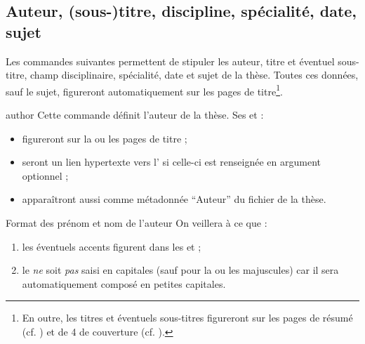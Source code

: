 \subsection{Auteur, (sous-)titre, discipline, spécialité,
  date, sujet}\label{sec-caracteristiques}

Les commandes suivantes permettent de stipuler les auteur, titre et éventuel
sous-titre, champ disciplinaire, spécialité, date et sujet de la thèse. Toutes
ces données, sauf le sujet, figureront automatiquement sur les pages de
titre\footnote{En outre, les titres et éventuels sous-titres figureront sur les
  pages de résumé (cf. ) et de 4\ieme{} de couverture (cf.
  ).}.
%
\begin{docCommand}[doc description=\mandatory]{author}{}%
  Cette commande définit l'auteur de la thèse. Ses  et
   :
  \begin{itemize}
  \item figureront sur la ou les pages de titre ;
  \item%
    seront un lien hypertexte vers l' si celle-ci est
    renseignée en argument optionnel ;
  \item apparaîtront aussi comme métadonnée \enquote{Auteur} du
    fichier \pdf{} de la thèse.
  \end{itemize}
  \begin{dbwarning}{Format des prénom et nom de l'auteur}{}
    On veillera à ce que :
    \begin{enumerate}
    \item les éventuels accents figurent dans les  et
      ;
    \item {}%
      le  \emph{ne} soit \emph{pas} saisi en capitales (sauf pour la
      ou les majuscules) car il sera automatiquement composé en petites
      capitales.
    \end{enumerate}
  \end{dbwarning}
\end{docCommand}
